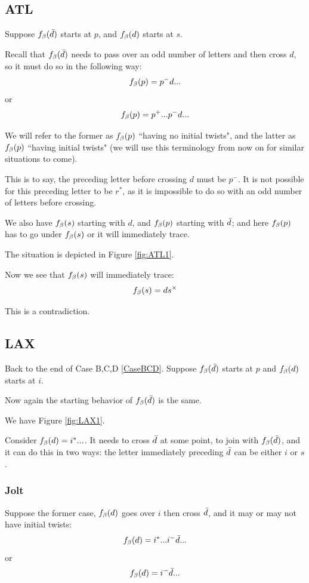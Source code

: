 \subsection{ATL}\label{ATL}
Suppose $f_\beta(\bar{d})$ starts at $p$, and $f_\beta(d)$ starts at $s$.

Recall that $f_\beta(\bar{d})$ needs to pass over an odd number of letters and then cross $d$, so it must do so in the following way:
\[
f_\beta(p) = p^- d...
\]
or
\[
f_\beta(p) = p^+... p^- d...
\]

We will refer to the former as $f_\beta(p)$ ``having no initial twists", and the latter as $f_\beta(p)$ ``having initial twists" (we will use this terminology from now on for similar situations to come).

This is to say, the preceding letter before crossing $d$ must be $p^-$. It is not possible for this preceding letter to be $r^*$, as it is impossible to do so with an odd number of letters before crossing.



We also have $f_\beta(s)$ starting with $d$, and $f_\beta(p)$ starting with $\bar{d}$; and here $f_\beta(p)$ has to go under $f_\beta(s)$ or it will immediately trace.

The situation is depicted in Figure \ref{fig:ATL1}.

Now we see that $f_\beta(s)$ will immediately trace:
\[
f_\beta(s) = d s^\times
\]

This is a contradiction.

\subsection{LAX}\label{LAX}

Back to the end of Case B,C,D \ref{CaseBCD}. Suppose $f_\beta(\bar{d})$ starts at $p$ and $f_\beta(d)$ starts at $i$.

Now again the starting behavior of $f_\beta(\bar{d})$ is the same. 

We have Figure \ref{fig:LAX1}.

Consider $f_\beta(d) = i^*...$. It needs to cross $\bar{d}$ at some point, to join with $f_\beta(\bar{d})$, and it can do this in two ways: the letter immediately preceding $\bar{d}$ can be either $i$ or $s$. 

\subsubsection{Jolt}\label{Jolt}
Suppose the former case, $f_\beta(d)$ goes over $i$ then cross $\bar{d}$, and it may or may not have initial twists:
\[
f_\beta(d) = i^*...i^- \bar{d}...
\]
or
\[
f_\beta(d) = i^- \bar{d}...
\]

